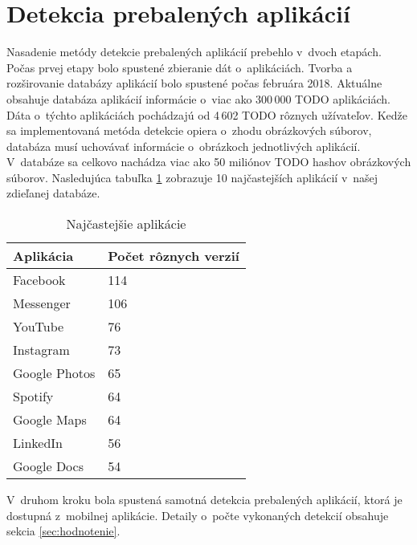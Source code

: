 \section{Detekcia prebalených aplikácií}
Nasadenie metódy detekcie prebalených aplikácií prebehlo v~dvoch etapách. Počas prvej etapy bolo spustené zbieranie dát o~aplikáciách. Tvorba a rozširovanie databázy aplikácií bolo spustené počas februára 2018. Aktuálne obsahuje databáza aplikácií informácie o~viac ako 300\,000 TODO aplikáciách. Dáta o~týchto aplikáciách pochádzajú od 4\,602 TODO rôznych užívateľov. Kedže sa implementovaná metóda detekcie opiera o~zhodu obrázkových súborov, databáza musí uchovávať informácie o~obrázkoch jednotlivých aplikácií. V~databáze sa celkovo nachádza viac ako 50 miliónov TODO hashov obrázkových súborov.
Nasledujúca tabuľka \ref{apps-common} zobrazuje 10 najčastejších aplikácií v~našej zdieľanej databáze.

\begin{table}[]
\centering
\begin{tabular}{|l|l|}
\hline
Aplikácia     & Počet rôznych verzií \\ \hline
Facebook      & 114                  \\
Messenger     & 106                  \\
YouTube       & 76                   \\
Instagram     & 73                   \\
Google Photos & 65                   \\
Spotify       & 64                   \\
Google Maps   & 64                   \\
LinkedIn      & 56                   \\
Google Docs   & 54                   \\ \hline
\end{tabular}
\caption{Najčastejšie aplikácie}
\label{apps-common}
\end{table}

V~druhom kroku bola spustená samotná detekcia prebalených aplikácií, ktorá je dostupná z~mobilnej aplikácie. Detaily o~počte vykonaných detekcií obsahuje sekcia \ref{sec:hodnotenie}.
